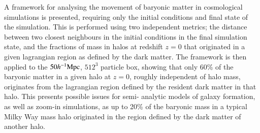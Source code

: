 A framework for analysing the movement of baryonic matter in cosmological
simulations is presented, requiring only the initial conditions and final
state of the simulation. This is performed using two independent metrics; the
distance between two closest neighbours in the initial conditions in the
final simulation state, and the fractions of mass in halos at redshift $z=0$
that originated in a given lagrangian region as defined by the dark matter.
The framework is then applied to the $50h^{-1}{\rm Mpc}{}$, $512^3$ particle \simba{}
box, showing that only 60\% of the baryonic matter in a given halo at $z=0$,
roughly independent of halo mass, originates from the lagrangian region
defined by the resident dark matter in that halo. This presents possible
issues for semi- analytic models of galaxy formation, as well as zoom-in
simulations, as up to 20\% of the baryonic mass in a typical Milky Way mass
halo originated in the region defined by the dark matter of another halo.